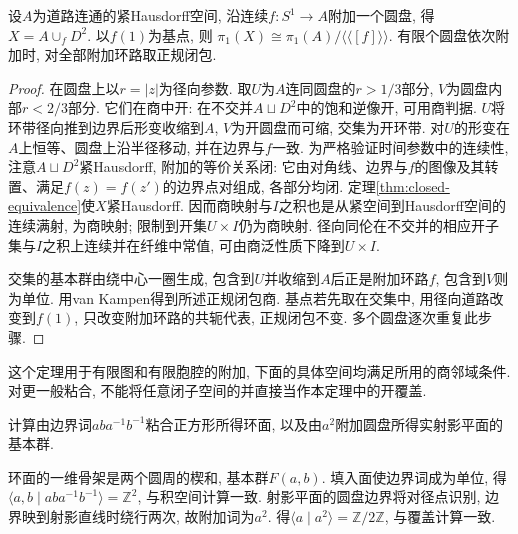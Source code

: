 \begin{theorem}\label{thm:attach-cell-pi1}
设$A$为道路连通的紧Hausdorff空间, 沿连续$f:S^1\to A$附加一个圆盘, 得$X=A\cup_f D^2$. 以$f(1)$为基点, 则
$\pi_1(X)\cong\pi_1(A)/\langle\!\langle[f]\rangle\!\rangle$.
有限个圆盘依次附加时, 对全部附加环路取正规闭包.
\end{theorem}
\begin{proof}
在圆盘上以$r=|z|$为径向参数. 取$U$为$A$连同圆盘的$r>1/3$部分, $V$为圆盘内部$r<2/3$部分. 它们在商中开: 在不交并$A\sqcup D^2$中的饱和逆像开, 可用商判据. $U$将环带径向推到边界后形变收缩到$A$, $V$为开圆盘而可缩, 交集为开环带. 对$U$的形变在$A$上恒等、圆盘上沿半径移动, 并在边界与$f$一致. 为严格验证时间参数中的连续性, 注意$A\sqcup D^2$紧Hausdorff, 附加的等价关系闭: 它由对角线、边界与$f$的图像及其转置、满足$f(z)=f(z')$的边界点对组成, 各部分均闭. 定理\ref{thm:closed-equivalence}使$X$紧Hausdorff. 因而商映射与$I$之积也是从紧空间到Hausdorff空间的连续满射, 为商映射; 限制到开集$U\times I$仍为商映射. 径向同伦在不交并的相应开子集与$I$之积上连续并在纤维中常值, 可由商泛性质下降到$U\times I$.

交集的基本群由绕中心一圈生成, 包含到$U$并收缩到$A$后正是附加环路$f$, 包含到$V$则为单位. 用van Kampen得到所述正规闭包商. 基点若先取在交集中, 用径向道路改变到$f(1)$, 只改变附加环路的共轭代表, 正规闭包不变. 多个圆盘逐次重复此步骤.
\end{proof}
这个定理用于有限图和有限胞腔的附加, 下面的具体空间均满足所用的商邻域条件. 对更一般粘合, 不能将任意闭子空间的并直接当作本定理中的开覆盖.

\begin{example}
计算由边界词$aba^{-1}b^{-1}$粘合正方形所得环面, 以及由$a^2$附加圆盘所得实射影平面的基本群.
\end{example}
\begin{solution}
环面的一维骨架是两个圆周的楔和, 基本群$F(a,b)$. 填入面使边界词成为单位, 得$\langle a,b\mid aba^{-1}b^{-1}\rangle=\mathbb Z^2$, 与积空间计算一致. 射影平面的圆盘边界将对径点识别, 边界映到射影直线时绕行两次, 故附加词为$a^2$. 得$\langle a\mid a^2\rangle=\mathbb Z/2\mathbb Z$, 与覆盖计算一致.
\end{solution}

